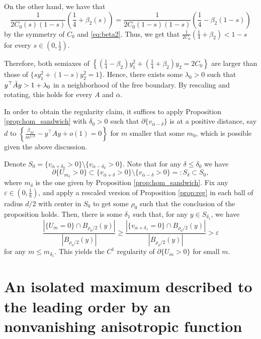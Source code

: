 \documentclass[10pt,a4paper]{article}
\numberwithin{equation}{section}
\begin{document}
On the other hand, we have that 
\[\frac{1}{2C_0(s) (1-s)} \left( \frac{1}{4} + \beta_2(s) \right) = \frac{1}{2C_0(1-s) (1-s)} \left( \frac{1}{4} - \beta_2(1-s)\right)  \]
by the symmetry of $ C_0 $ and \eqref{eq:beta2}. Thus, we get that $ \frac{1}{2C_0} \left( \frac{1}{4} + \beta_2 \right) < 1-s $ for every $ s\in (0,\frac{1}{2}) $. 

Therefore, both semiaxes of $ \left\{ \left( \frac14 - \beta_2\right) y_1^2 + \left( \frac14 + \beta_2 \right)y_2 = 2C_0 \right\} $ are larger than those of $ \{ sy_1^2 + (1-s)y_2^2  = 1 \} $. Hence, there exists some $ \lambda_0 > 0$ such that $ y^{\top}\Tilde{A} y> 1 + \lambda_0 $ in a neighborhood of the free boundary. By rescaling and rotating, this holds for every $ A $ and $ \overline{\alpha} $.

In order to obtain the regularity claim, it suffices to apply Proposition \ref{prop:hom_sandwich} with $ \delta_0 > 0 $ such that $ \partial \{v_{\overline{\alpha} - \delta} \} $ is at a positive distance, say $ d $ to $ \left\{ \frac{\beta_M}{m^{1/3}} - y^{\top}A y + o(1) = 0 \right\} $ for $ m $ smaller that some $ m_0 $, which is possible given the above discussion.

Denote $S_0 =  \{v_{\overline{\alpha} + \delta_0}> 0 \}\setminus \{v_{\overline{\alpha} - \delta_0}> 0 \}$. Note that for any $ \delta \leq \delta_0 $ we have
\[
	\partial \{U_{m_{\delta}} > 0\} \subset \{v_{\overline{\alpha} + \delta}> 0 \}\setminus \{v_{\overline{\alpha} - \delta}> 0 \} =: S_{\delta} \subset S_0,
\]
where $ m_{\delta} $ is the one given by Proposition \ref{prop:hom_sandwich}. Fix any $ \varepsilon \in (0, \frac{1}{8}) $, and apply a rescaled version of Proposition \ref{prop:reg} in each ball of radius $ d/2 $ with center in $ S_0 $ to get some $ \rho_0 $ such that the conclusion of the proposition holds. Then, there is some $ \delta_1 $ such that, for any $y \in S_{\delta_1} $, we have
\[\frac{|\{U_{m} = 0\} \cap B_{\rho_0 / 2}(y)|}{|B_{\rho_0 / 2}(y)|} \geq \frac{|\{v_{\overline{\alpha} + \delta_1} = 0 \} \cap B_{\rho_0/2}(y) |}{|B_{\rho_0/2}(y)|} > \varepsilon\]
for any $ m\leq m_{\delta_1} $. This yields the $ C^1 $ regularity of $ \partial \{U_{m} > 0\} $ for small $ m $. 

\section{An isolated maximum described to the leading order by an nonvanishing anisotropic function}
\label{sect:inhom}
\end{document}
